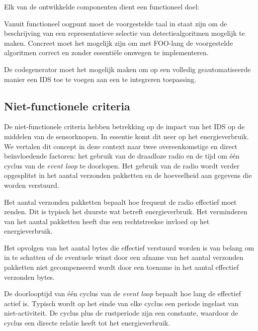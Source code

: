 Elk van de ontwikkelde componenten dient een functioneel doel:

\begin{description}[itemsep=1pt, topsep=0pt, partopsep=2pt]

  \item[Expressiviteit] Vanuit functioneel oogpunt moet de voorgestelde taal in
  staat zijn om de beschrijving van een representatieve selectie van
  detectiealgoritmen mogelijk te maken. Concreet moet het mogelijk zijn om met
  FOO-lang de voorgestelde algoritmen correct en zonder essenti\"ele omwegen
  te implementeren.

  \item[Automatiseerbaarheid] De codegenerator moet het mogelijk maken om op
  een volledig geautomatiseerde manier een IDS toe te voegen aan een te
  integreren toepassing.

\end{description}

\vspace{-3mm}

\subsection{Niet-functionele criteria}

De niet-functionele criteria hebben betrekking op de impact van het IDS op de
middelen van de sensorknopen. In essentie komt dit neer op het energieverbruik.
We vertalen dit concept in deze context naar twee overeenkomstige en direct
be\"invloedende factoren: het gebruik van de draadloze radio en de tijd om
\'e\'en cyclus van de \emph{event loop} te doorlopen. Het gebruik van de radio
wordt verder opgesplitst in het aantal verzonden pakketten en de hoeveelheid
aan gegevens die worden verstuurd.

\begin{description}[itemsep=1pt, topsep=0pt, partopsep=2pt]
  
  \item[Aantal verzonden netwerkpakketten] Het aantal verzonden pakketten
  bepaalt hoe frequent de radio effectief moet zenden. Dit is typisch het
  duurste wat betreft energieverbruik. Het verminderen van het aantal pakketten
  heeft dus een rechtstreekse invloed op het energieverbruik.

  \item[Aantal verzonden bytes] Het opvolgen van het aantal bytes die effectief
  verstuurd worden is van belang om in te schatten of de eventuele winst door
  een afname van het aantal verzonden pakketten niet gecompenseerd wordt door
  een toename in het aantal effectief verzonden bytes.

  \item[Lengte event loop] De doorlooptijd van \'e\'en cyclus van de
  \emph{event loop} bepaalt hoe lang de \mcu effectief actief is. Typisch wordt
  op het einde van elke cyclus een periode ingelast van niet-activiteit. De
  cyclus plus de rustperiode zijn een constante, waardoor de cyclus een directe
  relatie heeft tot het energieverbruik.
  
\end{description}

